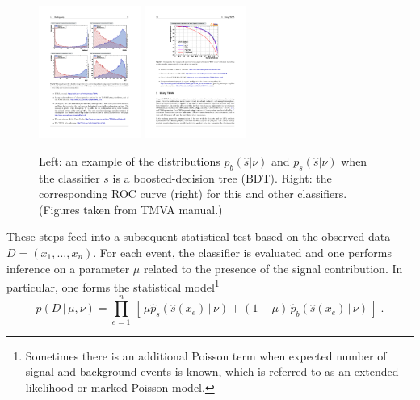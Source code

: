 \documentclass[aoas,preprint]{imsart}
\numberwithin{equation}{section}
\theoremstyle{plain}
\begin{document}
\begin{figure}[htbp]
\begin{center}
 \includegraphics[height=1.7in]{example-TMVA-BDT.pdf}
 \includegraphics[height=1.7in]{example-TMVA-ROC.pdf}
\caption{Left: an example of the distributions $p_b(\hat s|\nu)$ and $p_s(\hat s|\nu)$ when the classifier $s$ is a boosted-decision tree (BDT). Right: the corresponding ROC curve (right) for this and other classifiers. (Figures taken from TMVA manual.)}
\label{fig:tmva}
\end{center}
\end{figure}

These steps feed into a subsequent statistical test based on the observed data 
${D=(x_1, \dots, x_n)}$. For each event, the classifier is evaluated and one performs inference on a parameter $\mu$ related to the presence of the signal contribution. In particular, one forms the statistical model\footnote{Sometimes there is an additional Poisson term when expected number of signal and background events is known, which is referred to as an extended likelihood or marked Poisson model.} 
\begin{equation}\label{eq:typicalML}
p( D \,|\, \mu, \nu) = \prod_{e=1}^n \, \left[\, \mu \hat{p}_s( \hat s(x_e) \, |\,  \nu)  + (1-\mu)\, \hat{p}_b( \hat s(x_e) \,|\, \nu) \,\right] \; .
\end{equation}
\end{document}
